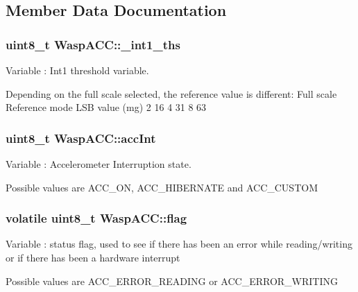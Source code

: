 \subsection{Member Data Documentation}
\subsubsection[{\texorpdfstring{\+\_\+int1\+\_\+ths}{_int1_ths}}]{\setlength{\rightskip}{0pt plus 5cm}uint8\+\_\+t Wasp\+A\+C\+C\+::\+\_\+int1\+\_\+ths}\hypertarget{class_wasp_a_c_c_a78a11c8f00171fc654921f6fd6e563b8}{}\label{class_wasp_a_c_c_a78a11c8f00171fc654921f6fd6e563b8}


Variable \+: Int1 threshold variable. 

Depending on the full scale selected, the reference value is different\+: Full scale Reference mode L\+SB value (mg) 2 16 4 31 8 63 
\subsubsection[{\texorpdfstring{acc\+Int}{accInt}}]{\setlength{\rightskip}{0pt plus 5cm}uint8\+\_\+t Wasp\+A\+C\+C\+::acc\+Int}\hypertarget{class_wasp_a_c_c_adaaf55e90566fe60d0142cbd751c358f}{}\label{class_wasp_a_c_c_adaaf55e90566fe60d0142cbd751c358f}


Variable \+: Accelerometer Interruption state. 

Possible values are A\+C\+C\+\_\+\+ON, A\+C\+C\+\_\+\+H\+I\+B\+E\+R\+N\+A\+TE and A\+C\+C\+\_\+\+C\+U\+S\+T\+OM 
\subsubsection[{\texorpdfstring{flag}{flag}}]{\setlength{\rightskip}{0pt plus 5cm}volatile uint8\+\_\+t Wasp\+A\+C\+C\+::flag}\hypertarget{class_wasp_a_c_c_a68bd866582dd3a6cffb18c806b22b5de}{}\label{class_wasp_a_c_c_a68bd866582dd3a6cffb18c806b22b5de}
Variable \+: status flag, used to see if there has been an error while reading/writing or if there has been a hardware interrupt

Possible values are A\+C\+C\+\_\+\+E\+R\+R\+O\+R\+\_\+\+R\+E\+A\+D\+I\+NG or A\+C\+C\+\_\+\+E\+R\+R\+O\+R\+\_\+\+W\+R\+I\+T\+I\+NG 
